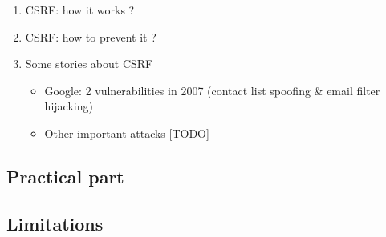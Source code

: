 \documentclass[a4paper,11pt]{article}
\begin{document}
  \begin{enumerate}
   \item CSRF: how it works ?
   \item CSRF: how to prevent it ?
   \item Some stories about CSRF
   \begin{itemize}
    \item Google: 2 vulnerabilities in 2007 (contact list spoofing \& email filter hijacking)
    \item Other important attacks [TODO] %
   \end{itemize}
  \end{enumerate}
  
  \subsection{Practical part}
  
  \subsection{Limitations}

  


\end{document}
